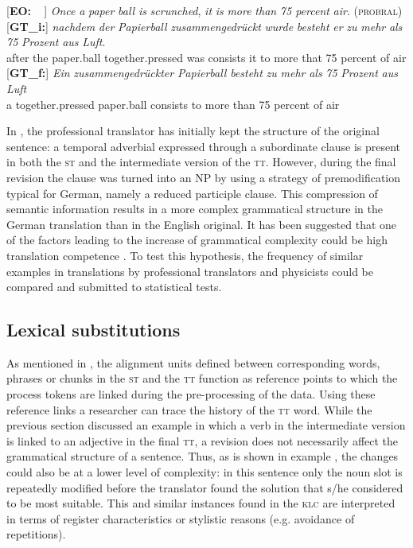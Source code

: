 \documentclass[output=paper]{LSP/langsci}
\begin{document}
\newpage
\ea \label{ex:1:9}
\begin{xlist}
\exi{}[\textbf{EO:~~}]{ \emph{Once} \emph{a} \emph{paper} \emph{ball} \emph{is} \emph{scrunched}, \emph{it} \emph{is} \emph{more} \emph{than} \emph{75 percent} \emph{air}. (\textsc{probral})}
\exi{}[\textbf{GT\_i:}]{
\gll \emph{nachdem} \emph{der} \emph{Papierball} \emph{zusammengedrückt} \emph{wurde} \emph{besteht} \emph{er} \emph{zu} \emph{mehr} \emph{als} \emph{75} \emph{Prozent} \emph{aus} \emph{Luft}.\\
after the paper.ball together.pressed was consists it to more that 75 percent of air\\}
\exi{}[\textbf{GT\_f:}]{
\gll \emph{Ein} \emph{zusammengedrückter} \emph{Papierball} \emph{besteht} \emph{zu} \emph{mehr} \emph{als} \emph{75} \emph{Prozent} \emph{aus} \emph{Luft}\\
a together.pressed paper.ball consists to more than 75 percent of air\\
}
\end{xlist}
\z

In , the professional translator has initially kept the structure of the original sentence: a temporal adverbial expressed through a subordinate clause is present in both the \textsc{st} and the intermediate version of the \textsc{tt}. However, during the final revision the clause was turned into an NP by using a strategy of premodification typical for German, namely a reduced participle clause. This compression of semantic information results in a more complex grammatical structure in the German translation than in the English original. It has been suggested that one of the factors leading to the increase of grammatical complexity could be high translation competence \citep[260]{Hansen-Schirra2012}. To test this hypothesis, the frequency of similar examples in translations by professional translators and physicists could be compared and submitted to statistical tests. 

\subsection{Lexical substitutions} \label{sec:1:3:5}
As mentioned in , the alignment units defined between corresponding words, phrases or chunks in the \textsc{st} and the \textsc{tt} function as reference points to which the process tokens are linked during the pre-processing of the data. Using these reference links a researcher can trace the history of the \textsc{tt} word. While the previous section discussed an example in which a verb in the intermediate version is linked to an adjective in the final \textsc{tt}, a revision does not necessarily affect the grammatical structure of a sentence. Thus, as is shown in example , the changes could also be at a lower level of complexity: in this sentence only the noun slot is repeatedly modified before the translator found the solution that s/he considered to be most suitable. This and similar instances found in the \textsc{klc} are interpreted in terms of register characteristics or stylistic reasons (e.g. avoidance of repetitions).
\end{document}
